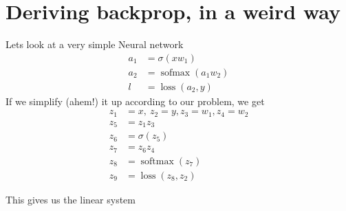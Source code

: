 \documentclass[12pt,crop=false,class=article,convert={density=300,outext=.compiled.png}]{standalone}
\begin{document}
\section*{Deriving backprop, in a weird way}

Lets look at a very simple Neural network
\begin{align*}
a_1 &= \sigma(x w_1)
\\
a_2 &= \operatorname{sofmax}(a_1 w_2)
\\
l &= \operatorname{loss}(a_2,y)
\end{align*} If we simplify (ahem!) it
up according to our problem, we get
 \begin{align*}
z_1&=x,~ z_2=y, z_3=w_1, z_4=w_2
\\z_5 &= z_1z_3
\\z_6 &= \sigma(z_5)
\\z_7 &= z_6z_4
\\z_8 &= \operatorname{softmax}(z_7)
\\z_9 &= \operatorname{loss}(z_8,z_2)
\end{align*} 

This gives us the linear system
\end{document}
